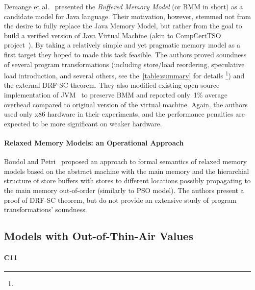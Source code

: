 Demange et al.~\cite{Demange-al:POPL13} presented 
the \emph{Buffered Memory Model} (or BMM in short)
as a candidate model for Java language.
Their motivation, however, stemmed not from the desire 
to fully replace the Java Memory Model, but rather 
from the goal to build a verified version of 
Java Virtual Machine (akin to CompCertTSO project~\cite{Sevcik-al:JACM13}).
By taking a relatively simple and yet pragmatic memory model
as a first target they hoped to made this task feasible. 
The authors proved soundness of several program transformations
(including store/load reordering, speculative load introduction,
and several others, see 
the~\cref{table:summary} for details%
\footnote{})
and the external DRF-SC theorem. 
They also modified existing open-source implementation of 
JVM~\cite{Pizlo-al:ECCS10} to preserve BMM and 
reported only~1\% average overhead 
compared to original version of the virtual machine. 
Again, the authors used only x86 hardware in their 
experiments, and the performance penalties 
are expected to be more significant on weaker hardware.   

\paragraph{Relaxed Memory Models: an Operational Approach}

Boudol and Petri~\cite{Boudol-Petri:POPL09} proposed 
an approach to formal semantics of relaxed memory models 
based on the abstract machine with the main memory 
and the hierarchial structure of store buffers 
with stores to different locations possibly 
propagating to the main memory out-of-order
(similarly to PSO model).
The authors present a proof of DRF-SC theorem,
but do not provide an extensive study 
of program transformations' soundness.

\subsection{Models with Out-of-Thin-Air Values}

\paragraph{C11}

